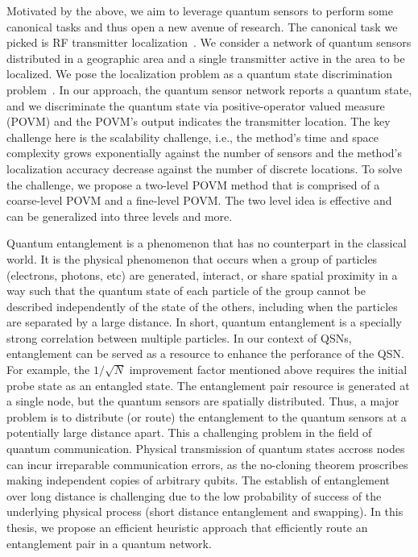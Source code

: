 Motivated by the above, we aim to leverage quantum sensors to perform some canonical tasks and thus open a new avenue of research.
The canonical task we picked is RF transmitter localization~\cite{nsdi13-arraytrack,pmc22-deepmtlpro}.
We consider a network of quantum sensors distributed in a geographic area and a single transmitter active in the area to be localized.
We pose the localization problem as a quantum state discrimination problem~\cite{bergou-review-2007}. 
In our approach, the quantum sensor network reports a quantum state, and we discriminate the quantum state via 
positive-operator valued measure (POVM) and the POVM's output indicates the transmitter location.
The key challenge here is the scalability challenge, i.e., the method's time and space complexity grows exponentially against the
number of sensors and the method's localization accuracy decrease against the number of discrete locations.
To solve the challenge, we propose a two-level POVM method that is comprised of a coarse-level POVM and a fine-level POVM.
The two level idea is effective and can be generalized into three levels and more.

Quantum entanglement is a phenomenon that has no counterpart in the classical world.
It is the physical phenomenon that occurs when a group of particles (electrons, photons, etc) are generated, interact, or share spatial proximity in a way such that
the quantum state of each particle of the group cannot be described independently of the state of the others, including when the particles
are separated by a large distance.
In short, quantum entanglement is a specially strong correlation between multiple particles.
In our context of QSNs, entanglement can be served as a resource to enhance the perforance of the QSN.
For example, the $1 / \sqrt{N}$ improvement factor mentioned above requires the initial probe state as an entangled state.
The entanglement pair resource is generated at a single node, but the quantum sensors are spatially distributed.
Thus, a major problem is to distribute (or route) the entanglement to the quantum sensors at a potentially large distance apart.
This a challenging problem in the field of quantum communication.
Physical transmission of quantum states accross nodes can incur irreparable communication errors, as the no-cloning theorem proscribes
making independent copies of arbitrary qubits.
The establish of entanglement over long distance is challenging due to the low probability of success of the underlying physical process
(short distance entanglement and swapping).
In this thesis, we propose an efficient heuristic approach that efficiently route an entanglement pair in a quantum network.

